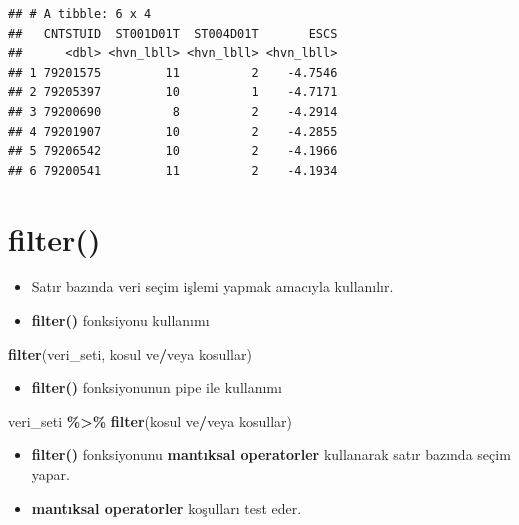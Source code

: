 \documentclass[
  oneside]{book}
\newenvironment{Shaded}{\begin{snugshade}}{\end{snugshade}}
\newcommand{\FunctionTok}[1]{\textcolor[rgb]{0.13,0.29,0.53}{\textbf{#1}}}
\newcommand{\NormalTok}[1]{#1}
\newcommand{\SpecialCharTok}[1]{\textcolor[rgb]{0.81,0.36,0.00}{\textbf{#1}}}
\providecommand{\tightlist}{%
  \setlength{\itemsep}{0pt}\setlength{\parskip}{0pt}}
\begin{document}
\begin{verbatim}
## # A tibble: 6 x 4
##   CNTSTUID  ST001D01T  ST004D01T       ESCS
##      <dbl> <hvn_lbll> <hvn_lbll> <hvn_lbll>
## 1 79201575         11          2    -4.7546
## 2 79205397         10          1    -4.7171
## 3 79200690          8          2    -4.2914
## 4 79201907         10          2    -4.2855
## 5 79206542         10          2    -4.1966
## 6 79200541         11          2    -4.1934
\end{verbatim}

\hypertarget{filter}{%
\section{\texorpdfstring{\textbf{filter()}}{filter()}}\label{filter}}

\begin{itemize}
\item
  Satır bazında veri seçim işlemi yapmak amacıyla kullanılır.
\item
  \textbf{filter()} fonksiyonu kullanımı
\end{itemize}

\begin{Shaded}
\begin{Highlighting}[]
\FunctionTok{filter}\NormalTok{(veri\_seti, kosul ve}\SpecialCharTok{/}\NormalTok{veya kosullar)}
\end{Highlighting}
\end{Shaded}

\begin{itemize}
\tightlist
\item
  \textbf{filter()} fonksiyonunun pipe ile kullanımı
\end{itemize}

\begin{Shaded}
\begin{Highlighting}[]
\NormalTok{veri\_seti }\SpecialCharTok{\%\textgreater{}\%} \FunctionTok{filter}\NormalTok{(kosul ve}\SpecialCharTok{/}\NormalTok{veya kosullar)}
\end{Highlighting}
\end{Shaded}

\begin{itemize}
\item
  \textbf{filter()} fonksiyonunu \textbf{mantıksal operatorler} kullanarak satır bazında seçim yapar.
\item
  \textbf{mantıksal operatorler} koşulları test eder.
\end{itemize}
\end{document}
